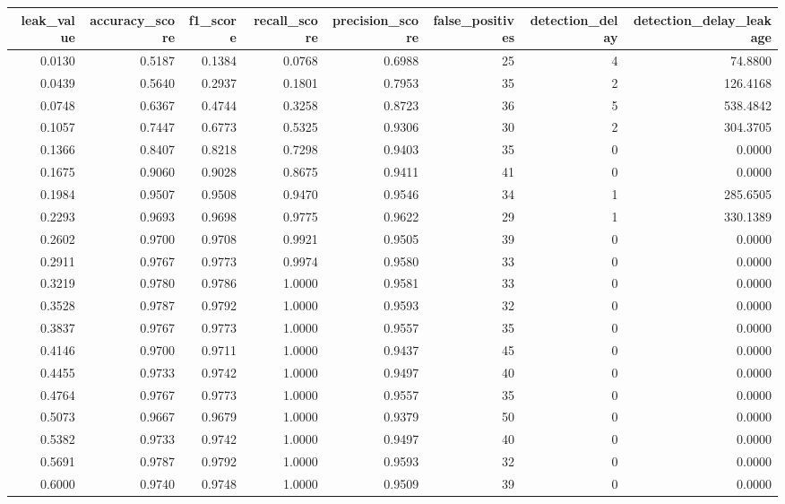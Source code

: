 \begin{tabular}{rrrrrrrr}
\toprule
leak\_value & accuracy\_score & f1\_score & recall\_score & precision\_score & false\_positives & detection\_delay & detection\_delay\_leakage \\
\midrule
0.0130 & 0.5187 & 0.1384 & 0.0768 & 0.6988 & 25 & 4 & 74.8800 \\
0.0439 & 0.5640 & 0.2937 & 0.1801 & 0.7953 & 35 & 2 & 126.4168 \\
0.0748 & 0.6367 & 0.4744 & 0.3258 & 0.8723 & 36 & 5 & 538.4842 \\
0.1057 & 0.7447 & 0.6773 & 0.5325 & 0.9306 & 30 & 2 & 304.3705 \\
0.1366 & 0.8407 & 0.8218 & 0.7298 & 0.9403 & 35 & 0 & 0.0000 \\
0.1675 & 0.9060 & 0.9028 & 0.8675 & 0.9411 & 41 & 0 & 0.0000 \\
0.1984 & 0.9507 & 0.9508 & 0.9470 & 0.9546 & 34 & 1 & 285.6505 \\
0.2293 & 0.9693 & 0.9698 & 0.9775 & 0.9622 & 29 & 1 & 330.1389 \\
0.2602 & 0.9700 & 0.9708 & 0.9921 & 0.9505 & 39 & 0 & 0.0000 \\
0.2911 & 0.9767 & 0.9773 & 0.9974 & 0.9580 & 33 & 0 & 0.0000 \\
0.3219 & 0.9780 & 0.9786 & 1.0000 & 0.9581 & 33 & 0 & 0.0000 \\
0.3528 & 0.9787 & 0.9792 & 1.0000 & 0.9593 & 32 & 0 & 0.0000 \\
0.3837 & 0.9767 & 0.9773 & 1.0000 & 0.9557 & 35 & 0 & 0.0000 \\
0.4146 & 0.9700 & 0.9711 & 1.0000 & 0.9437 & 45 & 0 & 0.0000 \\
0.4455 & 0.9733 & 0.9742 & 1.0000 & 0.9497 & 40 & 0 & 0.0000 \\
0.4764 & 0.9767 & 0.9773 & 1.0000 & 0.9557 & 35 & 0 & 0.0000 \\
0.5073 & 0.9667 & 0.9679 & 1.0000 & 0.9379 & 50 & 0 & 0.0000 \\
0.5382 & 0.9733 & 0.9742 & 1.0000 & 0.9497 & 40 & 0 & 0.0000 \\
0.5691 & 0.9787 & 0.9792 & 1.0000 & 0.9593 & 32 & 0 & 0.0000 \\
0.6000 & 0.9740 & 0.9748 & 1.0000 & 0.9509 & 39 & 0 & 0.0000 \\
\bottomrule
\end{tabular}
